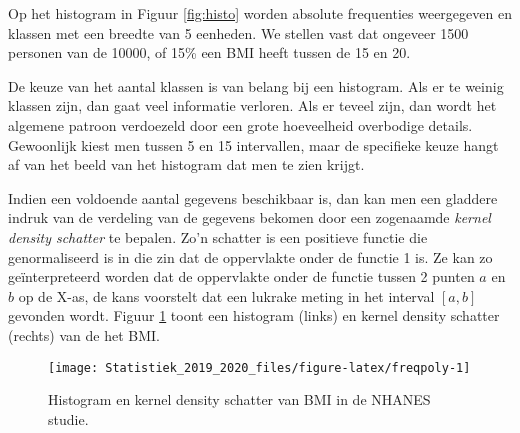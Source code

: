 \documentclass[12pt,dutch,coursenotes]{book}
\newenvironment{Shaded}{\begin{snugshade}}{\end{snugshade}}
\newcommand{\KeywordTok}[1]{\textcolor[rgb]{0.13,0.29,0.53}{\textbf{#1}}}
\newcommand{\DataTypeTok}[1]{\textcolor[rgb]{0.13,0.29,0.53}{#1}}
\newcommand{\DecValTok}[1]{\textcolor[rgb]{0.00,0.00,0.81}{#1}}
\newcommand{\StringTok}[1]{\textcolor[rgb]{0.31,0.60,0.02}{#1}}
\newcommand{\CommentTok}[1]{\textcolor[rgb]{0.56,0.35,0.01}{\textit{#1}}}
\newcommand{\OtherTok}[1]{\textcolor[rgb]{0.56,0.35,0.01}{#1}}
\newcommand{\OperatorTok}[1]{\textcolor[rgb]{0.81,0.36,0.00}{\textbf{#1}}}
\newcommand{\NormalTok}[1]{#1}
\theoremstyle{definition}
\theoremstyle{definition}
\theoremstyle{definition}
\theoremstyle{remark}
\begin{document}
Op het histogram in Figuur \ref{fig:histo} worden absolute frequenties
weergegeven en klassen met een breedte van 5 eenheden. We stellen vast
dat ongeveer 1500 personen van de 10000, of 15\% een BMI heeft tussen de
15 en 20.

De keuze van het aantal klassen is van belang bij een histogram. Als er
te weinig klassen zijn, dan gaat veel informatie verloren. Als er teveel
zijn, dan wordt het algemene patroon verdoezeld door een grote
hoeveelheid overbodige details. Gewoonlijk kiest men tussen 5 en 15
intervallen, maar de specifieke keuze hangt af van het beeld van het
histogram dat men te zien krijgt.

Indien een voldoende aantal gegevens beschikbaar is, dan kan men een
gladdere indruk van de verdeling van de gegevens bekomen door een
zogenaamde \emph{kernel density schatter} te bepalen. Zo'n schatter is
een positieve functie die genormaliseerd is in die zin dat de
oppervlakte onder de functie 1 is. Ze kan zo geïnterpreteerd worden dat
de oppervlakte onder de functie tussen 2 punten \(a\) en \(b\) op de
X-as, de kans voorstelt dat een lukrake meting in het interval \([a,b]\)
gevonden wordt. Figuur \ref{fig:freqpoly} toont een histogram (links) en
kernel density schatter (rechts) van de het BMI.

\begin{Shaded}
\end{Shaded}

\begin{figure}

{\centering \texttt{[image: Statistiek\_2019\_2020\_files/figure-latex/freqpoly-1]} 

}

\caption{Histogram en kernel density schatter van BMI in de NHANES studie.}\label{fig:freqpoly}
\end{figure}
\end{document}
